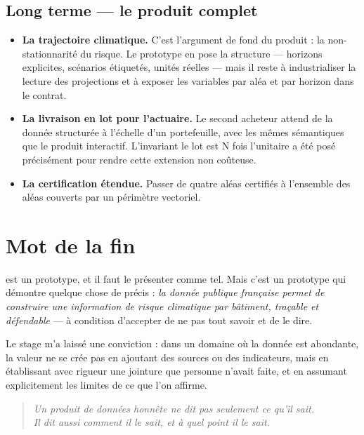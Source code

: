 \subsection{Long terme — le produit complet}

\begin{itemize}[leftmargin=1.4em]
  \item \textbf{La trajectoire climatique.} C'est l'argument de fond du
        produit : la non-stationnarité du risque. Le prototype en pose la
        structure — horizons explicites, scénarios étiquetés, unités réelles —
        mais il reste à industrialiser la lecture des projections et à exposer
        les variables par aléa et par horizon dans le contrat.
  \item \textbf{La livraison en lot pour l'actuaire.} Le second acheteur
        attend de la donnée structurée à l'échelle d'un portefeuille, avec les
        mêmes sémantiques que le produit interactif. L'invariant \og le lot est
        N fois l'unitaire \fg{} a été posé précisément pour rendre cette
        extension non coûteuse.
  \item \textbf{La certification étendue.} Passer de quatre aléas certifiés à
        l'ensemble des aléas couverts par un périmètre vectoriel.
\end{itemize}

\section{Mot de la fin}

\typhoon{} est un prototype, et il faut le présenter comme tel. Mais c'est un
prototype qui démontre quelque chose de précis : \emph{la donnée publique
française permet de construire une information de risque climatique par
bâtiment, traçable et défendable} — à condition d'accepter de ne pas tout
savoir et de le dire.

Le stage m'a laissé une conviction : dans un domaine où la donnée est
abondante, la valeur ne se crée pas en ajoutant des sources ou des indicateurs,
mais en établissant avec rigueur une jointure que personne n'avait faite, et en
assumant explicitement les limites de ce que l'on affirme.

\begin{quote}
\itshape
Un produit de données honnête ne dit pas seulement ce qu'il sait.\\
Il dit aussi comment il le sait, et à quel point il le sait.
\end{quote}
